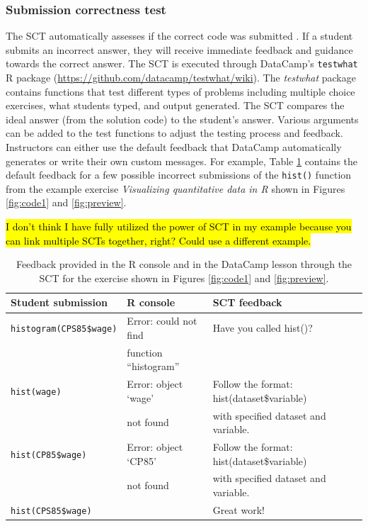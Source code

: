 \documentclass{tise_style_doi}
\begin{document}
\subsubsection{Submission correctness test}

The SCT automatically assesses if the correct code was submitted \citep{Vankrunkelsven2016}. 
If a student submits an incorrect answer, they will receive immediate feedback and guidance towards
the correct answer.  The SCT is executed through DataCamp's \texttt{testwhat} R
package (\url{https://github.com/datacamp/testwhat/wiki}). The \textit{testwhat} package
contains functions that test different types of problems including multiple choice
exercises, what students typed, and output generated.  The SCT compares the ideal answer
(from the solution code) to the student's answer. Various arguments can be added to the
test functions to adjust the testing process and feedback.  Instructors can either use the
default feedback that DataCamp automatically generates or write their own custom messages.
For example, Table \ref{tab:SCT} contains the default feedback for a few possible incorrect submissions
of the \texttt{hist()} function from the example
exercise \textit{Visualizing quantitative data in R} shown in Figures \ref{fig:code1} and
\ref{fig:preview}.

\hl{I don't think I have fully utilized the power of SCT in my example because
you can link multiple SCTs together, right?  Could use a different example.}

\begin{table}
\begin{tabular}{lll}
\toprule
Student submission & R console & SCT feedback \\
\midrule
\texttt{histogram(CPS85\$wage)} & Error: could not find & Have you called hist()? \\
                                & function ``histogram'' & \\
[2ex]
\texttt{hist(wage)} & Error: object `wage' & Follow the format: hist(dataset\$variable) \\
                    &  not found           & with specified dataset and variable.\\
[2ex]
\texttt{hist(CP85\$wage)} & Error: object `CP85' & Follow the format: hist(dataset\$variable) \\
                               & not found       & with specified dataset and variable. \\
[2ex]
\texttt{hist(CPS85\$wage)} & & Great work! \\
\bottomrule
\end{tabular}
\caption{Feedback provided in the R console and in the DataCamp lesson through the
SCT for the exercise shown in Figures \ref{fig:code1} and \ref{fig:preview}.}
\label{tab:SCT}
\end{table}
\end{document}
